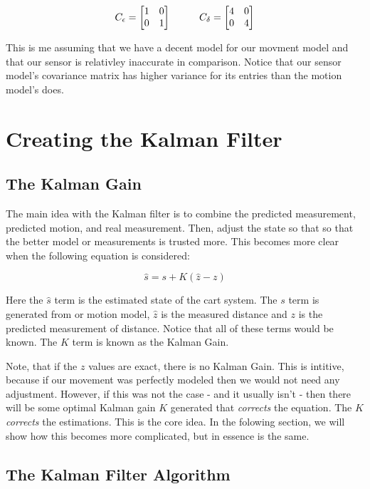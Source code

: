 \documentclass[11pt]{article}
\begin{document}
\[
C_{\epsilon} =
\begin{bmatrix}
1 & 0 \\
0 & 1
\end{bmatrix}
\hspace{10mm}
C_{\delta} =
\begin{bmatrix}
4 & 0 \\
0 & 4
\end{bmatrix}
\]

This is me assuming that we have a decent model for our movment model and that our
sensor is relativley inaccurate in comparison. Notice that our sensor model's
covariance matrix has higher variance for its entries than the motion model's does.

\section{Creating the Kalman Filter}

\subsection{The Kalman Gain}

The main idea with the Kalman filter is to combine the predicted measurement, predicted
motion, and real measurement. Then, adjust the state so that so that the better model
or measurements is trusted more. This becomes more clear when the following equation is
considered:

\[
\hat{s} = s + K (\hat{z} - z)
\]

Here the $\hat{s}$ term is the estimated state of the cart system. The $s$ term is
generated from or motion model, $\hat{z}$ is the measured distance and $z$ is the
predicted measurement of distance. Notice that all of these terms would be known.
The $K$ term is known as the Kalman Gain.

Note, that if the $z$ values are exact, there is no Kalman Gain. This is intitive,
because if our movement was perfectly modeled then we would not need any adjustment.
However, if this was not the case - and it usually isn't - then there will be some
optimal Kalman gain $K$ generated that \textit{corrects} the equation. The $K$
\textit{corrects} the estimations. This is the core idea. In the folowing section,
we will show how this becomes more complicated, but in essence is the same.

\subsection{The Kalman Filter Algorithm}
\end{document}
